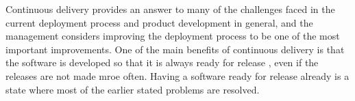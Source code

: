 \documentclass[english]{tktltiki2}
\theoremstyle{definition}
\theoremstyle{remark}
\begin{document}


Continuous delivery provides an answer to many of the challenges faced in the current deployment process and product development in general, and the management considers improving the deployment process to be one of the most important improvements. One of the main benefits of continuous delivery is that the software is developed so that it is always ready for release \cite{cdbook}, even if the releases are not made mroe often. Having a software ready for release already is a state where most of the earlier stated problems are resolved. %





%








\end{document}
